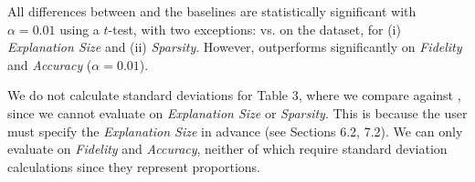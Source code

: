 All differences between \OurMethod{} and the baselines are statistically significant with $\alpha=0.01$ using a $t$-test, with two exceptions: \OurMethod{} vs. \baserm{} on the \synfive{} dataset, for (i) \textit{Explanation Size} and (ii) \textit{Sparsity}. However, \OurMethod{} outperforms \baserm{} significantly on \textit{Fidelity} and \textit{Accuracy} ($\alpha=0.01$). 


We do not calculate standard deviations for Table 3, where we compare against \gnnexplainer{}, since we cannot evaluate \gnnexplainer{} on \textit{Explanation Size} or \textit{Sparsity}. This is because the user must specify the \textit{Explanation Size} in advance (see Sections 6.2, 7.2). We can only evaluate \gnnexplainer{} on \textit{Fidelity} and \textit{Accuracy}, neither of which require standard deviation calculations since they represent proportions. 

